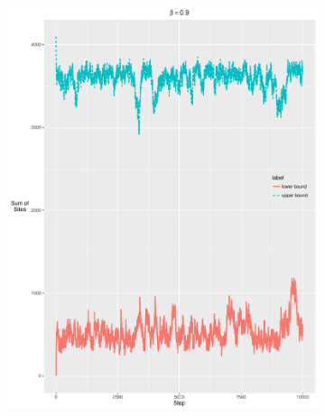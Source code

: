\documentclass[12pt, oneside]{article}   	%
\begin{document}
\begin{figure}[H]
\begin{subfigure}[b]{0.475\textwidth}
            \includegraphics[width=\textwidth, height=0.5\textheight]{090.pdf}
        \end{subfigure}
        \quad
        \begin{subfigure}[b]{0.475\textwidth}
            \centering

\end{subfigure}
\end{figure}
\end{document}

